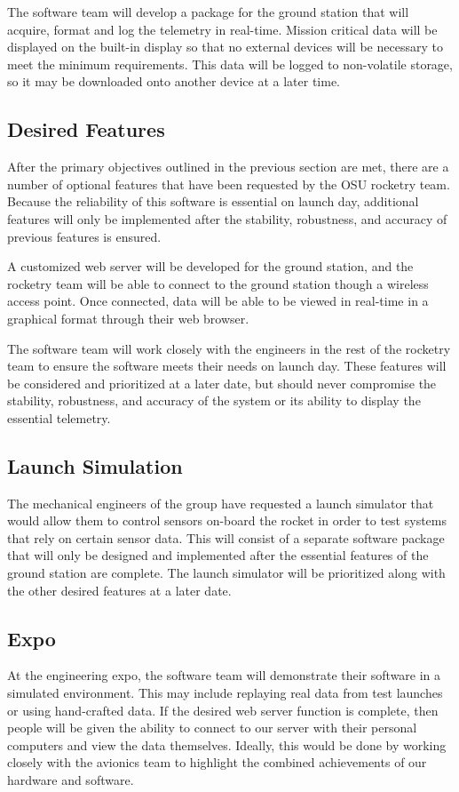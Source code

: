 \documentclass[10pt,journal,draftclsnofoot,onecolumn]{IEEEtran}
\begin{document}
	The software team will develop a package for the ground station that
	will acquire, format and log the telemetry in real-time.
	Mission critical data will be displayed on the built-in display so that
	no external devices will be necessary to meet the minimum requirements.
	This data will be logged to non-volatile storage, so it may be
	downloaded onto another device at a later time.
	
	\subsection{Desired Features}

	After the primary objectives outlined in the previous section
	are met, there are a number of optional features
	that have been requested by the \ac{OSU} rocketry team.
	Because the reliability of this software is essential on launch day,
	additional features will only be implemented after
	the stability, robustness, and accuracy of previous features
	is ensured.

	A customized web server will be developed for the ground station,
	and the rocketry team will be able to connect to the ground station
	though a wireless access point. Once connected, data will be able
	to be viewed in real-time in a graphical format through their
	web browser.

	The software team will work closely with the engineers in the
	rest of the rocketry team to ensure the software
	meets their needs on launch day. These features will be considered
	and prioritized at a later date, but should never compromise the stability,
	robustness, and accuracy of the system or its ability
	to display the essential telemetry.
	
	\subsection{Launch Simulation}
	
	The mechanical engineers of the group have requested a launch simulator that
	would allow them to control sensors on-board the rocket in order to test
	systems that rely on certain sensor data. This will consist of a separate
	software package that will only be designed and implemented after the
	essential features of the ground station are complete. The launch simulator
	will be prioritized along with the other desired features at a later date.

	\subsection{Expo}
	At the engineering expo, the software team will demonstrate their software
	in a simulated environment. This may include replaying real data from test launches
	or using hand-crafted data.
	If the desired web server function is complete, then people will be given the ability
	to connect to our server with their personal computers and view the data themselves.
	Ideally, this would be done by working closely
	with the avionics team to highlight the combined achievements of our
	hardware and software.
	
\end{document}
